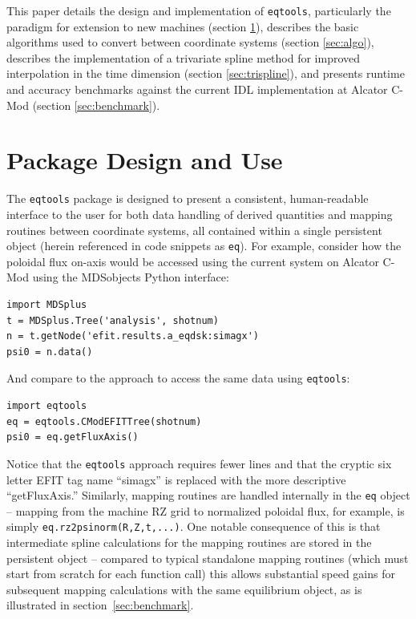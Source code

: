 \documentclass[12pt,floatfix,showpacs]{revtex4-1}
\newcommand{\gnote}[1]{\marginpar{\scriptsize\textcolor{red}{#1}}}
\newcommand{\eqtools}{\texttt{eqtools}\xspace}
\begin{document}
This paper details the design and implementation of \eqtools, particularly the paradigm for extension to new machines (section \ref{sec:design}), describes the basic algorithms used to convert between coordinate systems (section \ref{sec:algo}), describes the implementation of a trivariate spline method for improved interpolation in the time dimension (section \ref{sec:trispline}), and presents runtime and accuracy benchmarks against the current IDL implementation at Alcator C-Mod (section \ref{sec:benchmark}).

\section{Package Design and Use}\label{sec:design}

The \eqtools package is designed to present a consistent, human-readable interface to the user for both data handling of derived quantities and mapping routines between coordinate systems, all contained within a single persistent object (herein referenced in code snippets as \verb|eq|).
For example, consider how the poloidal flux on-axis would be accessed using the current system on Alcator C-Mod using the MDSobjects \cite{MDSobjects} Python interface:
\begin{verbatim}
import MDSplus
t = MDSplus.Tree('analysis', shotnum)
n = t.getNode('efit.results.a_eqdsk:simagx')
psi0 = n.data()
\end{verbatim}
And compare to the approach to access the same data using \eqtools:
\begin{verbatim}
import eqtools
eq = eqtools.CModEFITTree(shotnum)
psi0 = eq.getFluxAxis()
\end{verbatim}
Notice that the \eqtools approach requires fewer lines and that the cryptic six letter EFIT tag name ``simagx'' is replaced with the more descriptive ``getFluxAxis.''
Similarly, mapping routines are handled internally in the \verb|eq| object -- mapping from the machine RZ grid to normalized poloidal flux, for example, is simply \verb|eq.rz2psinorm(R,Z,t,...)|.  
One notable consequence of this is that intermediate spline calculations for the mapping routines are stored in the persistent object -- compared to typical standalone mapping routines (which must start from scratch for each function call) this allows substantial speed gains for subsequent mapping calculations with the same equilibrium object, as is illustrated in section~\ref{sec:benchmark}.
\end{document}
